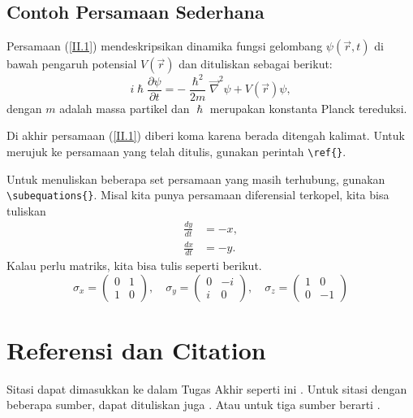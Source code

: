 \subsection{Contoh Persamaan Sederhana}
Persamaan (\ref{II.1}) mendeskripsikan dinamika fungsi gelombang $\psi(\vec{r},t)$ di bawah pengaruh potensial $V(\vec{r})$ dan dituliskan sebagai berikut:
\begin{equation}\label{II.1}
    i\hslash\frac{\partial \psi}{\partial t} = -\frac{\hslash^2}{2 m}\Vec{\nabla}^2 \psi + V(\vec{r})\psi,
\end{equation}
dengan $m$ adalah massa partikel dan $\hslash$ merupakan konstanta Planck tereduksi.

Di akhir persamaan (\ref{II.1}) diberi koma karena berada ditengah kalimat. Untuk merujuk ke persamaan yang telah ditulis, gunakan perintah \verb|\ref{}|.

Untuk menuliskan beberapa set persamaan yang masih terhubung, gunakan \verb|\subequations{}|. Misal kita punya persamaan diferensial terkopel, kita bisa tuliskan
\begin{subequations}
\begin{align}
    \frac{dy}{dt} &= -x ,\\
    \frac{dx}{dt} &= -y .
\end{align}
\end{subequations}
Kalau perlu matriks, kita bisa tulis seperti berikut.
\begin{equation}
    \sigma_x = \begin{pmatrix}
                0 & 1\\
                1 & 0
    \end{pmatrix},\quad
    \sigma_y = \begin{pmatrix}
                0 & -i\\
                i & 0
    \end{pmatrix}, \quad
    \sigma_z = \begin{pmatrix}
                1 & 0\\
                0 & -1
    \end{pmatrix}
\end{equation}


\section{Referensi dan Citation}
\noindent Sitasi dapat dimasukkan ke dalam Tugas Akhir seperti ini \cite{Fujita1996}. Untuk sitasi dengan beberapa sumber, dapat dituliskan juga \cite{hohen1964,Kim2006}. Atau untuk tiga sumber berarti \cite{kongkanand2006,kresse1999,Leibb1993}.
